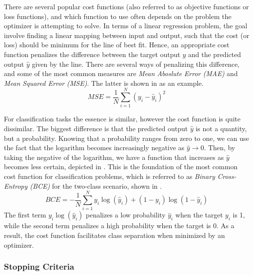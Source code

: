             There are several popular cost functions (also referred to as objective functions or loss functions), and which function to use often depends on the problem the optimizer is attempting to solve. 
            In terms of a linear regression problem, the goal involve finding a linear mapping between input and output, such that the cost (or loss) should be minimum for the line of best fit. Hence, an appropriate cost function penalizes the difference between the target output $y$ and the predicted output $\hat{y}$ given by the line. 
            There are several ways of penalizing this difference, and some of the most common measures are \emph{Mean Aboslute Error (MAE)} and \emph{Mean Squared Error (MSE)}. The latter is shown in  as an example.
            \begin{equation}\label{eq:mopt-mseloss}
                MSE = \frac{1}{N}\sum_{i=1}^N(y_i-\hat{y}_i)^2
            \end{equation}
            
            For classification tasks the essence is similar, however the cost function is quite dissimilar. The biggest difference is that the predicted output $\hat{y}$ is not a quantity, but a probability. Knowing that a probability ranges from zero to one, we can use the fact that the logarithm becomes increasingly negative as $\hat{y}\rightarrow0$. Then, by taking the negative of the logarithm, we have a function that increases as $\hat{y}$ becomes less certain, depicted in .
            This is the foundation of the most common cost function for classification problems, which is referred to as \emph{Binary Cross-Entropy (BCE)} for the two-class scenario, shown in .
            \begin{equation}\label{eq:mopt-bceloss}
                BCE = -\frac{1}{N}\sum_{i=1}^N y_i\log(\hat{y}_i)+(1-y_i)\log(1-\hat{y}_i)
            \end{equation}
            The first term $y_i\log(\hat{y}_i)$ penalizes a low probability $\hat{y}_i$ when the target $y_i$ is 1, while the second term penalizes a high probability when the target is 0. As a result, the cost function facilitates class separation when minimized by an optimizer.
        
        \subsubsection{Stopping Criteria}
        
